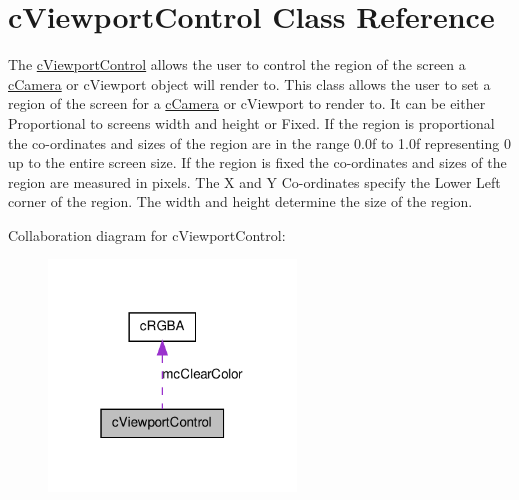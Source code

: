 \hypertarget{classc_viewport_control}{
\section{cViewportControl Class Reference}
\label{classc_viewport_control}
}


The \hyperlink{classc_viewport_control}{cViewportControl} allows the user to control the region of the screen a \hyperlink{classc_camera}{cCamera} or cViewport object will render to. This class allows the user to set a region of the screen for a \hyperlink{classc_camera}{cCamera} or cViewport to render to. It can be either Proportional to screens width and height or Fixed. If the region is proportional the co-\/ordinates and sizes of the region are in the range 0.0f to 1.0f representing 0 up to the entire screen size. If the region is fixed the co-\/ordinates and sizes of the region are measured in pixels. The X and Y Co-\/ordinates specify the Lower Left corner of the region. The width and height determine the size of the region.  




Collaboration diagram for cViewportControl:\nopagebreak
\begin{figure}[H]
\begin{center}
\leavevmode
\includegraphics[width=187pt]{classc_viewport_control__coll__graph}
\end{center}
\end{figure}

